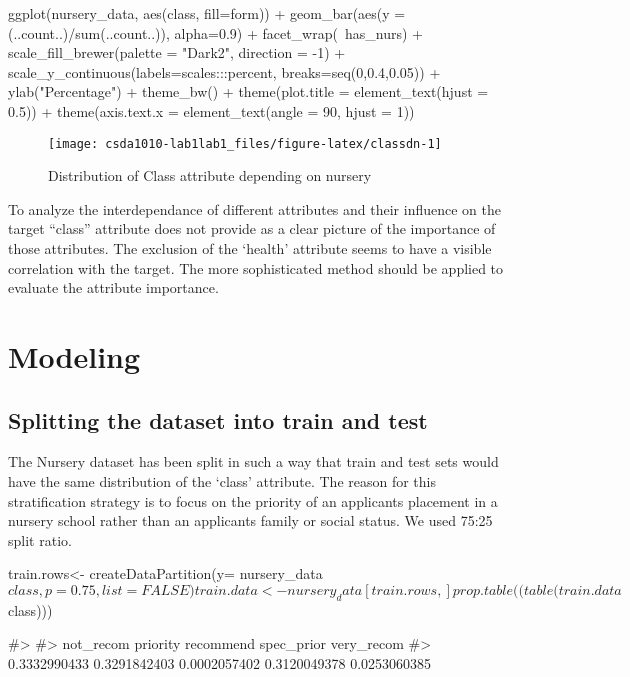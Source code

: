 \begin{Schunk}
\begin{Sinput}
ggplot(nursery_data, aes(class, fill=form)) + 
  geom_bar(aes(y = (..count..)/sum(..count..)), alpha=0.9) +
  facet_wrap(~has_nurs) + 
  scale_fill_brewer(palette = "Dark2", direction = -1) +
  scale_y_continuous(labels=scales:::percent, breaks=seq(0,0.4,0.05)) +
  ylab("Percentage") +
  theme_bw() +
  theme(plot.title = element_text(hjust = 0.5)) +
  theme(axis.text.x = element_text(angle = 90, hjust = 1))
\end{Sinput}
\begin{figure}[h]

\texttt{[image: csda1010-lab1lab1\_files/figure-latex/classdn-1]} \hfill{}

\caption[Distribution of Class attribute depending on nursery]{Distribution of Class attribute depending on nursery}\label{fig:classdn}
\end{figure}
\end{Schunk}

To analyze the interdependance of different attributes and their
influence on the target ``class'' attribute does not provide as a clear
picture of the importance of those attributes. The exclusion of the
`health' attribute seems to have a visible correlation with the target.
The more sophisticated method should be applied to evaluate the
attribute importance.

\hypertarget{modeling}{%
\section{Modeling}\label{modeling}}

\hypertarget{splitting-the-dataset-into-train-and-test}{%
\subsection{Splitting the dataset into train and
test}\label{splitting-the-dataset-into-train-and-test}}

The Nursery dataset has been split in such a way that train and test
sets would have the same distribution of the `class' attribute. The
reason for this stratification strategy is to focus on the priority of
an applicants placement in a nursery school rather than an applicants
family or social status. We used 75:25 split ratio.

\begin{Schunk}
\begin{Sinput}
train.rows<- createDataPartition(y= nursery_data$class, p=0.75, list = FALSE)
train.data<- nursery_data[train.rows,]
prop.table((table(train.data$class)))
\end{Sinput}
\begin{Soutput}
#> 
#>    not_recom     priority    recommend   spec_prior   very_recom 
#> 0.3332990433 0.3291842403 0.0002057402 0.3120049378 0.0253060385
\end{Soutput}
\end{Schunk}

